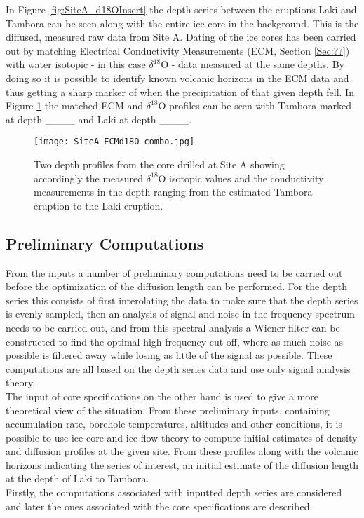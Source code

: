 \documentclass[../../CompleteThesis/Complete_1stDraft.tex]{subfiles}
\begin{document}
In Figure \ref{fig:SiteA_d18OInsert} the depth series between the eruptions Laki and Tambora can be seen along with the entire ice core in the background. This is the diffused, measured raw data from Site A. Dating of the ice cores has been carried out by matching Electrical Conductivity Measurements (ECM, Section \ref{Sec:??}) with water isotopic - in this case $\delta^{18}$O - data measured at the same depths. By doing so it is possible to identify known volcanic horizons in the ECM data and thus getting a sharp marker of when the precipitation of that given depth fell. In Figure \ref{fig:SiteA_ECMd18O_combo} the matched ECM and $\delta^{18}$O profiles can be seen with Tambora marked at depth \_\_\_\_ and Laki at depth \_\_\_\_.

\begin{figure}[h]
	\centering
	\texttt{[image: SiteA\_ECMd18O\_combo.jpg]}
	\caption[ECM and d18O data at LT, Site A.]{Two depth profiles from the core drilled at Site A showing accordingly the measured $\delta^{18}$O isotopic values and the conductivity measurements in the depth ranging from the estimated Tambora eruption to the Laki eruption.}	
	\label{fig:SiteA_ECMd18O_combo}
\end{figure}
\subsection[Preliminary Computations]{Preliminary Computations}
From the inputs a number of preliminary computations need to be carried out before the optimization of the diffusion length can be performed. For the depth series this consists of first interolating the data to make sure that the depth series is evenly sampled, then an analysis of signal and noise in the frequency spectrum needs to be carried out, and from this spectral analysis a Wiener filter can be constructed to find the optimal high frequency cut off, where as much noise as possible is filtered away while losing as little of the signal as possible. These computations are all based on the depth series data and use only signal analysis theory.\\
The input of core specifications on the other hand is used to give a more theoretical view of the situation. From these preliminary inputs, containing accumulation rate, borehole temperatures, altitudes and other conditions, it is possible to use ice core and ice flow theory to compute initial estimates of density and diffusion profiles at the given site. From these profiles along with the volcanic horizons indicating the series of interest, an initial estimate of the diffusion length at the depth of Laki to Tambora.\\
Firstly, the computations associated with inputted depth series are considered and later the ones associated with the core specifications are described. 
 
\end{document}
